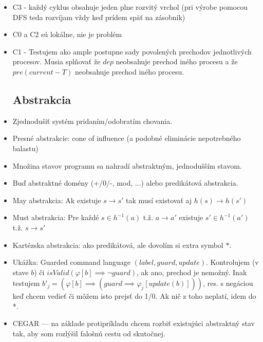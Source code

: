 \documentclass[paper=a4, fontsize=11pt]{scrartcl} %
\numberwithin{equation}{section} %
\numberwithin{figure}{section} %
\numberwithin{table}{section} %
\begin{document}
\begin{itemize}
	\item C3 - každý cyklus obsahuje jeden plne rozvitý vrchol (pri výrobe pomocou DFS teda rozvíjam vždy keď prídem späť na zásobník)
	
	\item C0 a C2 sú lokálne, nie je problém
	
	\item C1 - Testujem ako ample postupne sady povolených prechodov jednotlivých procesov. Musia splňovať že $dep$ neobsahuje prechod iného procesu a že $pre(current - T)$ neobsahuje prechod iného procesu.
	
	\subsection{Abstrakcia}
	
	\item Zjednodušiť systém pridaním/odobratím chovania.
	
	\item Presné abstrakcie: cone of influence (a podobné eliminácie nepotrebného balastu)
	
	\item Množina stavov programu sa nahradí abstraktným, jednodušším stavom.
	
	\item Buď abstraktné domény (+/0/-, mod, ...) alebo predikátová abstrakcia.
	
	\item May abstrakcia: Ak existuje $s \to s'$ tak musí existovať aj $h(s) \to h(s')$
	
	\item Must abstrakcia: Pre každé $s \in h^{-1}(a)$ t.ž. $a \to a'$ existuje $s' \in h^{-1}(a')$ t.ž. $s \to s'$ 
	
	\item Kartézska abstrakcia: ako predikátová, ale dovolím si extra symbol $*$.
	
	\item Ukážka: Guarded command language $(label, guard, update)$. Kontrolujem (v stave $b$) či $isValid(\varphi[b] \implies \neg guard)$, ak ano, prechod je nemožný. Inak testujem $b'_j = (\varphi[b] \implies (guard \implies \varphi_j[update(b)]))$, res. s negáciou keď chcem vedieť či môžem isto prejsť do 1/0. Ak nič z toho neplatí, idem do *.
	
	\item CEGAR — na základe protipríkladu chcem rozbiť existujúci abstraktný stav tak, aby som rozlýšil falošnú cestu od skutočnej.
	

\end{itemize}
\end{document}
